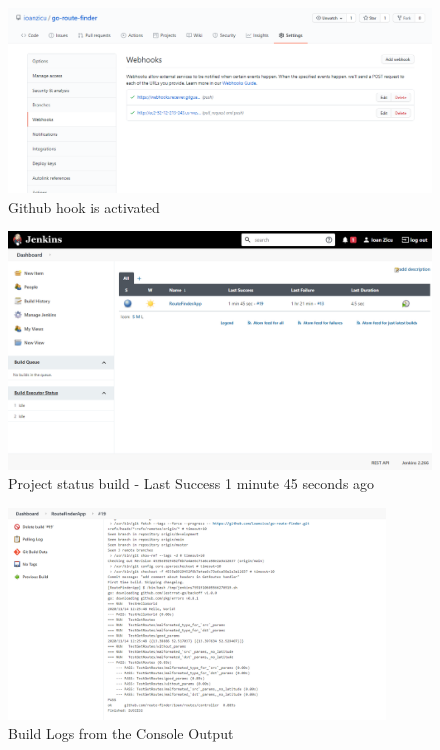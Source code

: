 \documentclass[12pt,a4paper,twoside]{article}
\begin{document}
\begin{figure}[h!]
    \centering
        \includegraphics[width=15cm]{images-aws/54---successfull-push-webhook.png}
        \caption{Github hook is activated}
\end{figure}


\begin{figure}[h!]
    \centering
        \includegraphics[width=15cm]{images-aws/55--triggered-push-3.png}
        \caption{Project status build - Last Success 1 minute 45 seconds ago}
\end{figure}


\begin{figure}[h!]
    \centering
        \includegraphics[width=10cm]{images-aws/56--triggered-push-4.png}
        \caption{Build Logs from the Console Output}
\end{figure}
\end{document}
